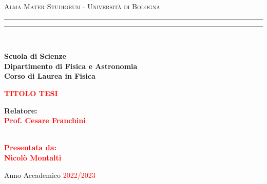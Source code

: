 \begin{titlepage}
%
%
%
%
\begin{center}
{{\Large{\textsc{Alma Mater Studiorum $\cdot$ Universit\`a di Bologna}}}} 
\rule[0.1cm]{15.8cm}{0.1mm}
\rule[0.5cm]{15.8cm}{0.6mm}
\\\vspace{3mm}

{\small{\bf Scuola di Scienze \\ 
Dipartimento di Fisica e Astronomia\\
Corso di Laurea in Fisica}}

\end{center}

\vspace{23mm}

\begin{center}\textcolor{red}{
%
%
{\LARGE{\bf TITOLO TESI}}\\
}\end{center}

\vspace{50mm} \par \noindent

\begin{minipage}[t]{0.47\textwidth}
%
%
{\large{\bf Relatore: \vspace{2mm}\\\textcolor{red}{
Prof. Cesare Franchini}\\\\
%
%
%
}}
\end{minipage}
%
\hfill
%
\begin{minipage}[t]{0.47\textwidth}\raggedleft \textcolor{red}
{\large{\bf Presentata da:
\vspace{2mm}\\
%
%
Nicolò Montalti}}
\end{minipage}

\vspace{40mm}

\begin{center}
%
%
Anno Accademico \textcolor{red}{ 2022/2023}
\end{center}

\end{titlepage}